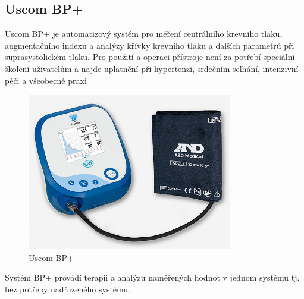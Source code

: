 \subsection{Uscom BP+}
Uscom BP+ je automatizový systém pro měření centrálního krevního tlaku, augmentačního indexu a analýzy křívky krevního tlaku a dalších parametrů při suprasystolickém tlaku.
Pro použití a operaci přístroje není za potřebí speciální školení uživatelům a najde uplatnění při hypertenzi, srdečním selhání, intenzivní péči a všeobecné praxi
\cite{cite:Uscom}
\begin{figure}[H]
    \caption{Uscom BP+ \cite{cite:Uscom}}
    \includegraphics[width=0.8\textwidth]{pictures/uscom_bp.jpg}
\end{figure}
Systém BP+ provádí terapii a analýzu naměřených hodnot v jednom systému tj. bez potřeby nadřazeného systému.
\cite{cite:Uscom}
